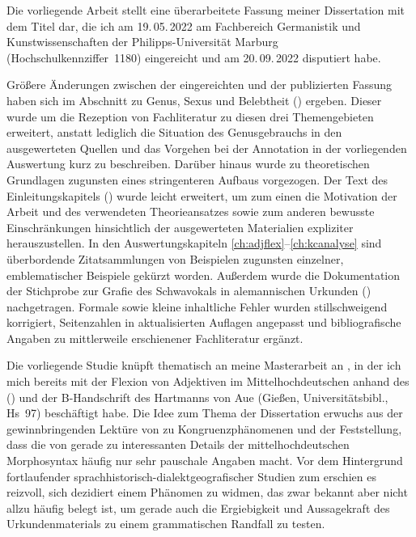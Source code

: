\addchap{\lsPrefaceTitle}

Die vorliegende Arbeit stellt eine überarbeitete Fassung meiner Dissertation
mit dem Titel  dar, die ich am 19.\,05.\,2022 am Fachbereich
Germanistik und Kunstwissenschaften der Philipps-Universität Marburg
(Hochschulkennziffer~1180) eingereicht und am 20.\,09.\,2022 disputiert habe.

Größere Änderungen zwischen der eingereichten und der publizierten Fassung
haben sich im Abschnitt zu Genus, Sexus und Belebtheit ()
ergeben. Dieser wurde um die Rezeption von Fachliteratur zu diesen drei
Themengebieten erweitert, anstatt lediglich die Situation des Genusgebrauchs in
den ausgewerteten Quellen und das Vorgehen bei der Annotation in der
vorliegenden Auswertung kurz zu beschreiben. Darüber hinaus wurde
 zu theoretischen Grundlagen zugunsten eines stringenteren
Aufbaus vorgezogen. Der Text des Einleitungskapitels ()
wurde leicht erweitert, um zum einen die Motivation der Arbeit und des
verwendeten Theorieansatzes sowie zum anderen bewusste Einschränkungen
hinsichtlich der ausgewerteten Materialien expliziter herauszustellen. In den
Auswertungskapiteln \ref{ch:adjflex}--\ref{ch:kcanalyse} sind überbordende
Zitatsammlungen von Beispielen zugunsten einzelner, emblematischer Beispiele
gekürzt worden. Außerdem wurde die Dokumentation der Stichprobe zur Grafie des
Schwa\-vokals in alemannischen Urkunden ()
nachgetragen. Formale sowie kleine inhaltliche Fehler wurden stillschweigend
korrigiert, Seitenzahlen in aktualisierten Auflagen angepasst und
bibliografische Angaben zu mittlerweile erschienener Fachliteratur ergänzt.

Die vorliegende Studie knüpft thematisch an meine Masterarbeit an
\autocite{becker2016}, in der ich mich bereits mit der Flexion von Adjektiven
im Mittelhochdeutschen anhand des  (\CAO) und der B-Handschrift des  Hartmanns von
Aue (Gießen, Universitätsbibl., Hs~97) beschäftigt habe. Die Idee zum Thema der
Dissertation erwuchs aus der gewinnbringenden Lektüre von \citet{corbett2006}
zu Kongruenzphänomenen und der Feststellung, dass die  von \citet{paul2007} gerade zu interessanten Details der
mittelhochdeutschen Morpho\-syntax häufig nur sehr pauschale Angaben macht. Vor
dem Hintergrund fortlaufender
sprachhistorisch-\allowbreak{}dialektgeografischer Studien zum \CAO{}
\autocite{beckerschallert2021,beckerschallert2022a, beckerschallert2022b}
erschien es reizvoll, sich dezidiert einem Phänomen zu widmen, das zwar bekannt
aber nicht allzu häufig belegt ist, um gerade auch die Ergiebigkeit und
Aussagekraft des Urkunden\-materials zu einem grammatischen Randfall zu testen.

